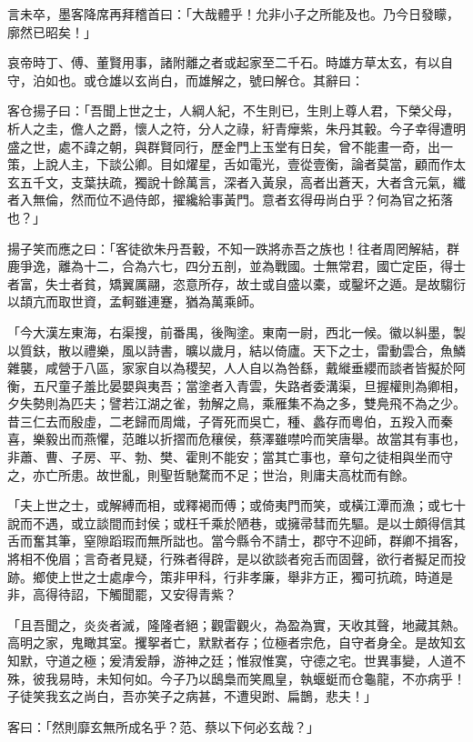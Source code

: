 \begin{pinyinscope}
言未卒，墨客降席再拜稽首曰：「大哉體乎！允非小子之所能及也。乃今日發矇，廓然已昭矣！」

哀帝時丁、傅、董賢用事，諸附離之者或起家至二千石。時雄方草太玄，有以自守，泊如也。或仓雄以玄尚白，而雄解之，號曰解仓。其辭曰：

客仓揚子曰：「吾聞上世之士，人綱人紀，不生則已，生則上尊人君，下榮父母，析人之圭，儋人之爵，懷人之符，分人之祿，紆青癴紫，朱丹其轂。今子幸得遭明盛之世，處不諱之朝，與群賢同行，歷金門上玉堂有日矣，曾不能畫一奇，出一策，上說人主，下談公卿。目如燿星，舌如電光，壹從壹衡，論者莫當，顧而作太玄五千文，支葉扶疏，獨說十餘萬言，深者入黃泉，高者出蒼天，大者含元氣，纖者入無倫，然而位不過侍郎，擢纔給事黃門。意者玄得毋尚白乎？何為官之拓落也？」

揚子笑而應之曰：「客徒欲朱丹吾轂，不知一跌將赤吾之族也！往者周罔解結，群鹿爭逸，離為十二，合為六七，四分五剖，並為戰國。士無常君，國亡定臣，得士者富，失士者貧，矯翼厲翮，恣意所存，故士或自盛以橐，或鑿坏之遁。是故騶衍以頡亢而取世資，孟軻雖連蹇，猶為萬乘師。

「今大漢左東海，右渠搜，前番禺，後陶塗。東南一尉，西北一候。徽以糾墨，製以質鈇，散以禮樂，風以詩書，曠以歲月，結以倚廬。天下之士，雷動雲合，魚鱗雜襲，咸營于八區，家家自以為稷契，人人自以為咎繇，戴縰垂纓而談者皆擬於阿衡，五尺童子羞比晏嬰與夷吾；當塗者入青雲，失路者委溝渠，旦握權則為卿相，夕失勢則為匹夫；譬若江湖之雀，勃解之鳥，乘雁集不為之多，雙鳧飛不為之少。昔三仁去而殷虛，二老歸而周熾，子胥死而吳亡，種、蠡存而粵伯，五羖入而秦喜，樂毅出而燕懼，范雎以折摺而危穰侯，蔡澤雖噤吟而笑唐舉。故當其有事也，非蕭、曹、子房、平、勃、樊、霍則不能安；當其亡事也，章句之徒相與坐而守之，亦亡所患。故世亂，則聖哲馳騖而不足；世治，則庸夫高枕而有餘。

「夫上世之士，或解縛而相，或釋褐而傅；或倚夷門而笑，或橫江潭而漁；或七十說而不遇，或立談間而封侯；或枉千乘於陋巷，或擁帚彗而先驅。是以士頗得信其舌而奮其筆，窒隙蹈瑕而無所詘也。當今縣令不請士，郡守不迎師，群卿不揖客，將相不俛眉；言奇者見疑，行殊者得辟，是以欲談者宛舌而固聲，欲行者擬足而投跡。鄉使上世之士處虖今，策非甲科，行非孝廉，舉非方正，獨可抗疏，時道是非，高得待詔，下觸聞罷，又安得青紫？

「且吾聞之，炎炎者滅，隆隆者絕；觀雷觀火，為盈為實，天收其聲，地藏其熱。高明之家，鬼瞰其室。攫挐者亡，默默者存；位極者宗危，自守者身全。是故知玄知默，守道之極；爰清爰靜，游神之廷；惟寂惟寞，守德之宅。世異事變，人道不殊，彼我易時，未知何如。今子乃以鴟梟而笑鳳皇，執蝘蜓而仓龜龍，不亦病乎！子徒笑我玄之尚白，吾亦笑子之病甚，不遭臾跗、扁鵲，悲夫！」

客曰：「然則靡玄無所成名乎？范、蔡以下何必玄哉？」


\end{pinyinscope}

